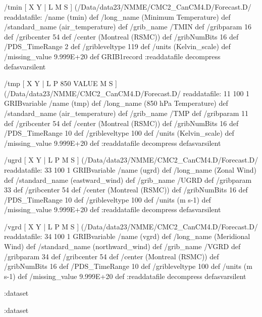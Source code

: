 \begin{ingrid}
/tmin {
[ X Y | L M S ] (/Data/data23/NMME/CMC2_CanCM4.D/Forecast.D/%
readdatafile: 
/name (tmin) def
/long_name (Minimum Temperature) def
/standard_name (air_temperature) def
/grib_name /TMIN def
/gribparam 16 def
/gribcenter 54 def
/center (Montreal (RSMC)) def
/gribNumBits 16 def
/PDS_TimeRange 2 def
/gribleveltype 119 def
/units (Kelvin_scale) def
/missing_value 9.999E+20 def
GRIB1record
:readdatafile decompress
} defasvarsilent

/tmp {
[ X Y | L P 850 VALUE M S ] (/Data/data23/NMME/CMC2_CanCM4.D/Forecast.D/%
readdatafile: 
11 100 1 GRIBvariable
/name (tmp) def
/long_name (850 hPa Temperature) def
/standard_name (air_temperature) def
/grib_name /TMP def
/gribparam 11 def
/gribcenter 54 def
/center (Montreal (RSMC)) def
/gribNumBits 16 def
/PDS_TimeRange 10 def
/gribleveltype 100 def
/units (Kelvin_scale) def
/missing_value 9.999E+20 def
:readdatafile decompress
} defasvarsilent

/ugrd {
[ X Y | L P M S ] (/Data/data23/NMME/CMC2_CanCM4.D/Forecast.D/%
readdatafile:
33 100 1 GRIBvariable 
/name (ugrd) def
/long_name (Zonal Wind) def
/standard_name (eastward_wind) def
/grib_name /UGRD def
/gribparam 33 def
/gribcenter 54 def
/center (Montreal (RSMC)) def
/gribNumBits 16 def
/PDS_TimeRange 10 def
/gribleveltype 100 def
/units (m s-1) def
/missing_value 9.999E+20 def
:readdatafile decompress
} defasvarsilent

/vgrd {
[ X Y | L P M S ] (/Data/data23/NMME/CMC2_CanCM4.D/Forecast.D/%
readdatafile:
34 100 1 GRIBvariable 
/name (vgrd) def
/long_name (Meridional Wind) def
/standard_name (northward_wind) def
/grib_name /VGRD def
/gribparam 34 def
/gribcenter 54 def
/center (Montreal (RSMC)) def
/gribNumBits 16 def
/PDS_TimeRange 10 def
/gribleveltype 100 def
/units (m s-1) def
/missing_value 9.999E+20 def
:readdatafile decompress
} defasvarsilent

:dataset

:dataset
\end{ingrid}

